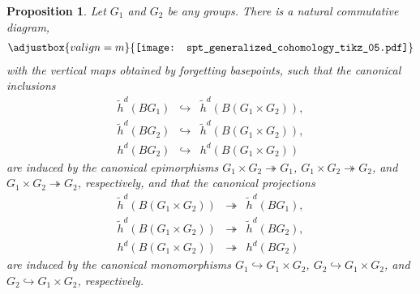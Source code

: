 \documentclass[sort&compress]{elsarticle}
\theoremstyle{theoremstyle}
\newtheorem{prp}[nul]{Proposition}
\theoremstyle{framedtheoremstyle}
\theoremstyle{definitionstyle}
\theoremstyle{definitionstyle}
\theoremstyle{definitionstyle}
\theoremstyle{definitionstyle}
\theoremstyle{nameddefinitionstyle}
\theoremstyle{framednameddefinitionstyle}
\theoremstyle{proofstyle}
\theoremstyle{definitionstyle}
\newcommand{\oneone}{\hookrightarrow}
\newcommand{\onto}{\twoheadrightarrow}
\newcommand{\isomorphic}{\cong}
\newcommand{\paren}[1]{\left( #1 \right)}
\begin{document}
\begin{appendices}


\begin{prp}\label{prp:generalization_arbitrary_product}
Let $G_1$ and $G_2$ be any groups. There is a natural commutative diagram,
\begin{eqnarray}
\adjustbox{valign=m}{\texttt{[image: spt\_generalized\_cohomology\_tikz\_05.pdf]}}
\label{generalization_arbitrary_product_diagram}
\end{eqnarray}
with the vertical maps obtained by forgetting basepoints,
such that the canonical inclusions
\begin{eqnarray}
\tilde h^d\paren{BG_1} &\oneone& \tilde h^d\paren{B\paren{G_1 \times G_2}}, \\
\tilde h^d\paren{BG_2} &\oneone& \tilde h^d\paren{B\paren{G_1 \times G_2}}, \\
h^d\paren{BG_2} &\oneone& h^d\paren{B\paren{G_1 \times G_2}}
\end{eqnarray}
are induced by the canonical epimorphisms $G_1\times G_2 \onto G_1$, $G_1\times G_2 \onto G_2$, and $G_1\times G_2 \onto G_2$, respectively, and that the canonical projections
\begin{eqnarray}
\tilde h^d\paren{B\paren{G_1 \times G_2}} &\onto& \tilde h^d\paren{BG_1}, \\
\tilde h^d\paren{B\paren{G_1 \times G_2}} &\onto& \tilde h^d\paren{BG_2} , \\
h^d\paren{B\paren{G_1 \times G_2}} &\onto& h^d\paren{BG_2} 
\end{eqnarray}
are induced by the canonical monomorphisms $G_1 \oneone G_1\times G_2$, $G_2 \oneone G_1 \times G_2$, and $G_2 \oneone G_1 \times G_2$, respectively.
\end{prp}


\end{appendices}
\end{document}
